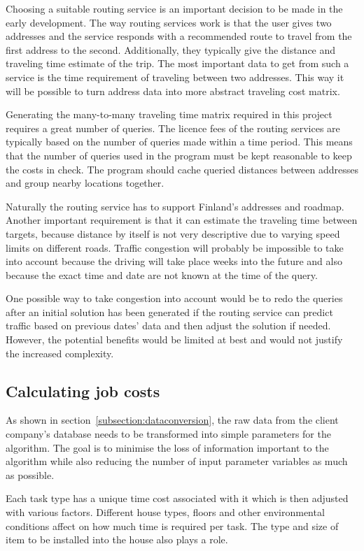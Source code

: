Choosing a suitable routing service is an important decision to be made in the early development. The way routing services work is that the user gives two addresses and the service responds with a recommended route to travel from the first address to the second. Additionally, they typically give the distance and traveling time estimate of the trip. The most important data to get from such a service is the time requirement of traveling between two addresses. This way it will be possible to turn address data into more abstract traveling cost matrix.

Generating the many-to-many traveling time matrix required in this project requires a great number of queries. The licence fees of the routing services are typically based on the number of queries made within a time period. This means that the number of queries used in the program must be kept reasonable to keep the costs in check. The program should cache queried distances between addresses and group nearby locations together.

Naturally the routing service has to support Finland's addresses and roadmap. Another important requirement is that it can estimate the traveling time between targets, because distance by itself is not very descriptive due to varying speed limits on different roads. Traffic congestion will probably be impossible to take into account because the driving will take place weeks into the future and also because the exact time and date are not known at the time of the query. 

One possible way to take congestion into account would be to redo the queries after an initial solution has been generated if the routing service can predict traffic based on previous dates' data and then adjust the solution if needed. However, the potential benefits would be limited at best and would not justify the increased complexity.


\subsection{Calculating job costs}

As shown in section~\ref{subsection:dataconversion}, the raw data from the client company's database needs to be transformed into simple parameters for the algorithm. The goal is to minimise the loss of information important to the algorithm while also reducing the number of input parameter variables as much as possible.  

Each task type has a unique time cost associated with it which is then adjusted with various factors. Different house types, floors and other environmental conditions affect on how much time is required per task. The type and size of item to be installed into the house also plays a role. 

